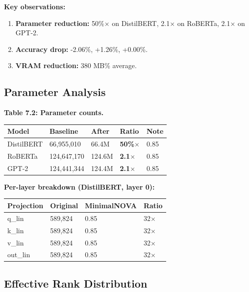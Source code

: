 \textbf{Key observations:}

\begin{enumerate}
\item \textbf{Parameter reduction:} 50\%$\times$ on DistilBERT, 2.1$\times$ on
  RoBERTa, 2.1$\times$ on GPT-2.
\item \textbf{Accuracy drop:} -2.06\%, +1.26\%, +0.00\%.
\item \textbf{VRAM reduction:} 380 MB\% average.

\end{enumerate}
\subsection{Parameter Analysis}

\textbf{Table 7.2: Parameter counts.}

\begin{table}[H]
\centering
\small
\begin{tabular}{lllll}
\toprule
\textbf{Model} & \textbf{Baseline} & \textbf{After} & \textbf{Ratio} & \textbf{Note} \\
\midrule
DistilBERT & 66,955,010 & 66.4M & \textbf{50\%$\times$} & 0.85 \\
RoBERTa & 124,647,170 & 124.6M & \textbf{2.1$\times$} & 0.85 \\
GPT-2 & 124,441,344 & 124.4M & \textbf{2.1$\times$} & 0.85 \\
\bottomrule
\end{tabular}
\end{table}

\textbf{Per-layer breakdown (DistilBERT, layer 0):}

\begin{table}[H]
\centering
\small
\begin{tabular}{llll}
\toprule
\textbf{Projection} & \textbf{Original} & \textbf{MinimalNOVA} & \textbf{Ratio} \\
\midrule
q\_lin & 589,824 & 0.85 & 32$\times$ \\
k\_lin & 589,824 & 0.85 & 32$\times$ \\
v\_lin & 589,824 & 0.85 & 32$\times$ \\
out\_lin & 589,824 & 0.85 & 32$\times$ \\
\bottomrule
\end{tabular}
\end{table}

\subsection{Effective Rank Distribution}

